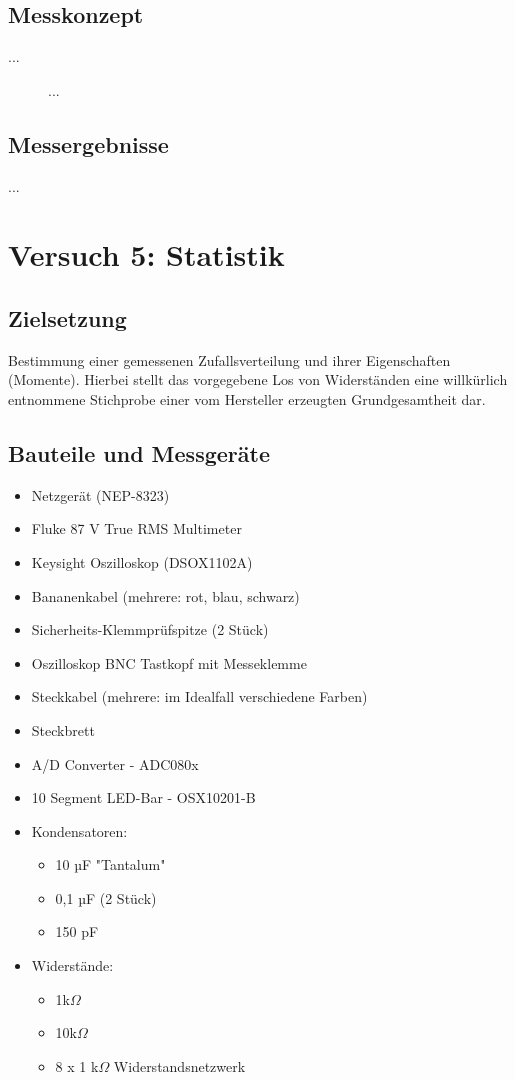 \documentclass[a4paper,12pt]{article}
\begin{document}
\subsection{Messkonzept}
...

\begin{figure}[H]
    \centering
\caption{...}
\end{figure}


\subsection{Messergebnisse}
...


\section{Versuch 5: Statistik}
\subsection{Zielsetzung}
Bestimmung einer gemessenen Zufallsverteilung und ihrer Eigenschaften (Momente). Hierbei stellt
das vorgegebene Los von Widerständen eine willkürlich entnommene Stichprobe einer vom
Hersteller erzeugten Grundgesamtheit dar.


\subsection{Bauteile und Messgeräte}
\begin{itemize}
\item Netzgerät (NEP-8323)
\item Fluke 87 V True RMS Multimeter
\item Keysight Oszilloskop (DSOX1102A)
\item Bananenkabel (mehrere: rot, blau, schwarz)
\item Sicherheits-Klemmprüfspitze (2 Stück)
\item Oszilloskop BNC Tastkopf mit Messeklemme
\item Steckkabel (mehrere: im Idealfall verschiedene Farben)
\item Steckbrett\\
\end{itemize}


\begin{itemize}
\item A/D Converter - ADC080x
\item 10 Segment LED-Bar - OSX10201-B
\newpage
\item Kondensatoren: 
	\begin{itemize}
	\item 10 µF "Tantalum"
	\item 0,1 µF (2 Stück)
	\item 150 pF
	\end{itemize}
\item Widerstände: 
	\begin{itemize}
	\item 1k$\Omega$
	\item 10k$\Omega$
	\item 8 x 1 k$\Omega$ Widerstandsnetzwerk
	\end{itemize}
\end{itemize}
\end{document}
